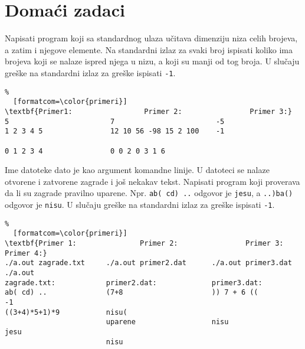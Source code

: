 \documentclass{article}
\begin{document}
\section{Domaći zadaci}
\begin{z}
Napisati program koji sa standardnog ulaza učitava dimenziju niza celih brojeva, a zatim i njegove
elemente. Na standardni izlaz za svaki broj ispisati koliko ima brojeva koji se nalaze ispred njega u nizu, a koji su manji od tog broja.
U slučaju greške na standardni izlaz za greške ispisati {\tt -1}. 
\end{z}
\begin{Verbatim}%
  [formatcom=\color{primeri}]
\textbf{Primer1:                 Primer 2:                Primer 3:}
5                        7                        -5
1 2 3 4 5                12 10 56 -98 15 2 100    -1

0 1 2 3 4                0 0 2 0 3 1 6
\end{Verbatim}

\begin{z}
Ime datoteke dato je kao argument komandne linije. U datoteci se
nalaze otvorene i zatvorene zagrade i jo\v s nekakav tekst. Napisati program koji proverava
da li su zagrade pravilno uparene. Npr. \verb|ab( cd) ..| odgovor je
\verb|jesu|, a \verb|..)ba()| odgovor je \verb|nisu|.
U slučaju greške na standardni izlaz za greške ispisati {\tt -1}. 
\end{z}
\begin{Verbatim}%
  [formatcom=\color{primeri}]
\textbf{Primer 1:               Primer 2:                Primer 3:               Primer 4:}
./a.out zagrade.txt     ./a.out primer2.dat      ./a.out primer3.dat     ./a.out
zagrade.txt:            primer2.dat:             primer3.dat:
ab( cd) ..              (7+8                     )) 7 + 6 ((             -1
((3+4)*5+1)*9           nisu(
                        uparene                  nisu
jesu
                        nisu
\end{Verbatim}
\end{document}
